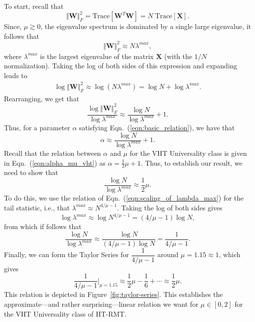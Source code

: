 {To start, recall that 
$$ 
\Vert \mathbf{W}\Vert_{F}^{2}=\mbox{Trace}[\mathbf{W}^{T}\mathbf{W}]=N\;\mbox{Trace}[\mathbf{X}]  .
$$
Since, $\mu \gtrsim 0$, 
the eigenvalue spectrum is dominated by a single large eigenvalue, it follows that
$$
\Vert \mathbf{W}\Vert_{F}^{2}\approx N\lambda^{max}  , 
$$
where $\lambda^{max}$ is the largest eigenvalue of the matrix $\mathbf{X}$ (with the $1/N$ normalization).
Taking the log of both sides of this expression and expanding leads to
\begin{eqnarray*}
\log\Vert \mathbf{W}\Vert_{F}^{2} 
   \approx \log \left( N\lambda^{max} \right) 
   =       \log N+\log\lambda^{max}  .
\end{eqnarray*}
Rearranging, we get that 
$$
\dfrac{\log\Vert \mathbf{W}\Vert_{F}^{2}}{\log\lambda^{max}}\approx \dfrac{\log N}{\log\lambda^{max}}+1  .
$$
Thus, for a parameter $\alpha$ satisfying Eqn.~(\ref{eqn:basic_relation}), we have that 
$$
\alpha\approx \dfrac{\log N}{\log\lambda^{max}}+1  .
$$
Recall that the relation between $\alpha$ and $\mu$ for the VHT Universality class is given in Eqn.~(\ref{eqn:alpha_mu_vht}) as
$ %
\alpha=\frac{1}{2}\mu+1  .
$ %
Thus, to establish our result, we need to show that
$$
\dfrac{\log N}{\log\lambda^{max}}\approx\dfrac{1}{2}\mu  .
$$
To do this, we use the relation of Eqn.~(\ref{eqn:scaling_of_lambda_max}) for the tail statistic, i.e., that 
$ %
\lambda^{max}\approx N^{4/\mu-1}  .
$ %
Taking the log of both sides gives
$$
\log\lambda^{max}\approx\log N^{4/\mu-1}=(4/\mu-1)\log N  ,
$$
from which if follows that
$$
\dfrac{\log N}{\log\lambda^{max}}\approx\dfrac{\log N}{(4/\mu-1)\log N}=\dfrac{1}{4/\mu-1}   .
$$
Finally, we can form the Taylor Series for $\dfrac{1}{4/\mu-1}$ around $\mu=1.15\approx 1$, which gives 
$$
\dfrac{1}{4/\mu-1}\bigg\rvert_{\mu=1.15}\approx\dfrac{1}{2}\mu-\dfrac{1}{6}+\cdots\approx\dfrac{1}{2}\mu  .
$$
This relation is depicted in Figure~\ref{fig:taylor-series}.
This establishes the approximate---and rather surprising---linear relation we want for $\mu\in[0,2]$ for
the VHT Universality class of HT-RMT.

}

